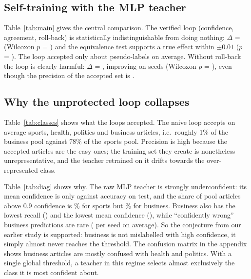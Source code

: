 \documentclass[11pt]{article}
\begin{document}
\subsection{Self-training with the MLP teacher}
Table~\ref{tab:main} gives the central comparison. The verified loop (confidence, agreement, roll-back) is statistically indistinguishable from doing nothing: $\Delta$ = \cmpMainVerified (Wilcoxon $p$ = \pMainVerified) and the equivalence test supports a true effect within $\pm0.01$ ($p$ = \tostMainVerified). The loop accepted only about \accMainVerified{} pseudo-labels on average. Without roll-back the loop is clearly harmful: $\Delta$ = \cmpMainNaive, improving on \nimpMainNaive{} seeds (Wilcoxon $p$ = \pMainNaive), even though the precision of the accepted set is \precMainNaive.

\begin{table}[t]
\centering\small
\caption{MLP teacher, 20 labels per class, \nSeeds{} paired seeds. PL precision = precision of accepted pseudo-labels against hidden gold labels. ``Accepted'' = mean size of the accepted set.}\label{tab:main}
\resizebox{\textwidth}{!}{}
\end{table}

\subsection{Why the unprotected loop collapses}
Table~\ref{tab:classes} shows what the loops accepted. The naive loop accepts on average \accNaiveSports{} sports, \accNaiveHealth{} health, \accNaivePolitics{} politics and \accNaiveBusiness{} business articles, i.e.\ roughly 1\% of the business pool against 78\% of the sports pool. Precision is high because the accepted articles are the easy ones; the training set they create is nonetheless unrepresentative, and the teacher retrained on it drifts towards the over-represented class.

\begin{table}[t]
\centering\small
\caption{Accepted pseudo-labels per class at the end of the loop (mean over seeds; acceptance rate $=$ accepted / pool size of that class in parentheses).}\label{tab:classes}
\resizebox{\textwidth}{!}{}
\end{table}

Table~\ref{tab:diag} shows why. The raw MLP teacher is strongly underconfident: its mean confidence is only \meanConfMlp{} against accuracy \accRoundZeroMlp{} on test, and the share of pool articles above 0.9 confidence is \shareZeroNineMlpSports\% for sports but \shareZeroNineMlpBusiness\% for business. Business also has the lowest recall (\recallMlpBusiness) and the lowest mean confidence (\meanConfMlpBusiness), while ``confidently wrong'' business predictions are rare (\cwrongMlpBusiness{} per seed on average). So the conjecture from our earlier study is supported: business is not mislabelled with high confidence, it simply almost never reaches the threshold. The confusion matrix in the appendix shows business articles are mostly confused with health and politics. With a single global threshold, a teacher in this regime selects almost exclusively the class it is most confident about.
\end{document}
